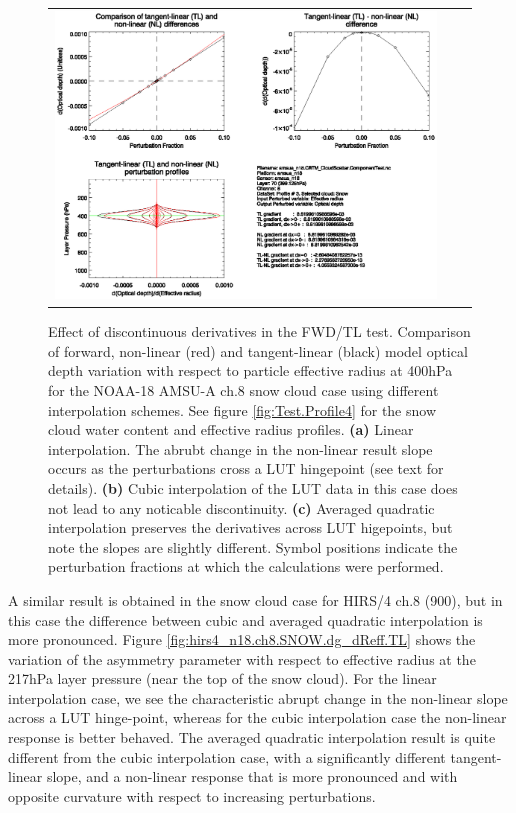 \begin{figure}[htp]
\begin{tabular}{c c c}
    \includegraphics[bb=90 400 300 540,clip,scale=0.7]{graphics/Cloud/TL/amsua_n18.ch8.SNOW.AVGQUAD.dOd_dReff.eps} 
  \end{tabular}
  \caption{Effect of discontinuous derivatives in the FWD/TL test. Comparison of forward, non-linear (red) and tangent-linear (black) model optical depth variation with respect to particle effective radius at 400hPa for the NOAA-18 AMSU-A ch.8 snow cloud case using different interpolation schemes. See figure \ref{fig:Test.Profile4} for the snow cloud water content and effective radius profiles.  \textbf{(a)} Linear interpolation. The abrubt change in the non-linear result slope occurs as the perturbations cross a LUT hingepoint (see text for details). \textbf{(b)} Cubic interpolation of the LUT data in this case does not lead to any noticable discontinuity. \textbf{(c)} Averaged quadratic interpolation preserves the derivatives across LUT higepoints, but note the slopes are slightly different. Symbol positions indicate the perturbation fractions at which the calculations were performed.}
  \label{fig:amsua_n18.ch8.SNOW.dOd_dReff.TL}
\end{figure}

A similar result is obtained in the snow cloud case for HIRS/4 ch.8 (900\invcm), but in this case the difference between cubic and averaged quadratic interpolation is more pronounced. Figure \ref{fig:hirs4_n18.ch8.SNOW.dg_dReff.TL} shows the variation of the asymmetry parameter with respect to effective radius at the 217hPa layer pressure (near the top of the snow cloud). For the linear interpolation case, we see the characteristic abrupt change in the non-linear slope across a LUT hinge-point, whereas for the cubic interpolation case the non-linear response is better behaved. The averaged quadratic interpolation result is quite different from the cubic interpolation case, with a significantly different tangent-linear slope, and a non-linear response that is more pronounced and with opposite curvature with respect to increasing perturbations.

